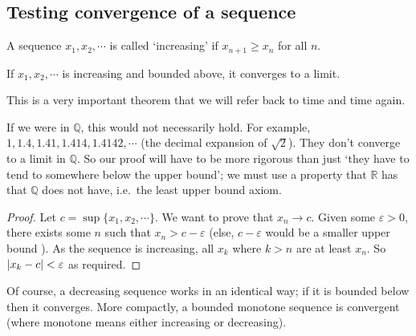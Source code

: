 \subsection{Testing convergence of a sequence}
A sequence \(x_1, x_2, \cdots\) is called `increasing' if \(x_{n+1} \geq x_n\) for all \(n\).
\begin{theorem}
	If \(x_1, x_2, \cdots\) is increasing and bounded above, it converges to a limit.
\end{theorem}
This is a very important theorem that we will refer back to time and time again.
\begin{note}
	If we were in \(\mathbb Q\), this would not necessarily hold.
	For example, \(1, 1.4, 1.41, 1.414, 1.4142, \cdots\) (the decimal expansion of \(\sqrt{2}\)).
	They don't converge to a limit in \(\mathbb Q\).
	So our proof will have to be more rigorous than just `they have to tend to somewhere below the upper bound'; we must use a property that \(\mathbb R\) has that \(\mathbb Q\) does not have, i.e.\ the least upper bound axiom.
\end{note}
\begin{proof}
	Let \(c = \sup \{ x_1, x_2, \cdots \}\).
	We want to prove that \(x_n \to c\).
	Given some \(\varepsilon > 0\), there exists some \(n\) such that \(x_n > c - \varepsilon\) (else, \(c - \varepsilon\) would be a smaller upper bound \contradiction).
	As the sequence is increasing, all \(x_k\) where \(k > n\) are at least \(x_n\).
	So \(\abs{x_k - c} < \varepsilon\) as required.
\end{proof}
Of course, a decreasing sequence works in an identical way; if it is bounded below then it converges.
More compactly, a bounded monotone sequence is convergent (where monotone means either increasing or decreasing).


